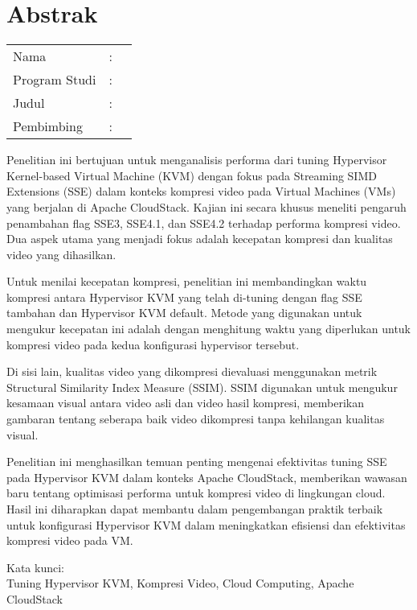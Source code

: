 %
%
%

\chapter*{Abstrak}

\vspace*{0.2cm}
{
	\setlength{\parindent}{0pt}
	
	\begin{tabular}{@{}l l p{10cm}}
		Nama&: & \penulis \\
		Program Studi&: & \program \\
		Judul&: & \judul \\
		Pembimbing&: & \pembimbing \\
	\end{tabular}

	\bigskip
	\bigskip
	
	Penelitian ini bertujuan untuk menganalisis performa dari tuning Hypervisor Kernel-based Virtual Machine (KVM) dengan fokus pada Streaming SIMD Extensions (SSE) dalam konteks kompresi video pada Virtual Machines (VMs) yang berjalan di Apache CloudStack. Kajian ini secara khusus meneliti pengaruh penambahan flag SSE3, SSE4.1, dan SSE4.2 terhadap performa kompresi video. Dua aspek utama yang menjadi fokus adalah kecepatan kompresi dan kualitas video yang dihasilkan.
	
	Untuk menilai kecepatan kompresi, penelitian ini membandingkan waktu kompresi antara Hypervisor KVM yang telah di-tuning dengan flag SSE tambahan dan Hypervisor KVM default. Metode yang digunakan untuk mengukur kecepatan ini adalah dengan menghitung waktu yang diperlukan untuk kompresi video pada kedua konfigurasi hypervisor tersebut.
	
	Di sisi lain, kualitas video yang dikompresi dievaluasi menggunakan metrik Structural Similarity Index Measure (SSIM). SSIM digunakan untuk mengukur kesamaan visual antara video asli dan video hasil kompresi, memberikan gambaran tentang seberapa baik video dikompresi tanpa kehilangan kualitas visual.
	
	Penelitian ini menghasilkan temuan penting mengenai efektivitas tuning SSE pada Hypervisor KVM dalam konteks Apache CloudStack, memberikan wawasan baru tentang optimisasi performa untuk kompresi video di lingkungan cloud. Hasil ini diharapkan dapat membantu dalam pengembangan praktik terbaik untuk konfigurasi Hypervisor KVM dalam meningkatkan efisiensi dan efektivitas kompresi video pada VM.

	\bigskip

	Kata kunci:\\
	Tuning Hypervisor KVM, Kompresi Video, Cloud Computing, Apache CloudStack
}

\newpage